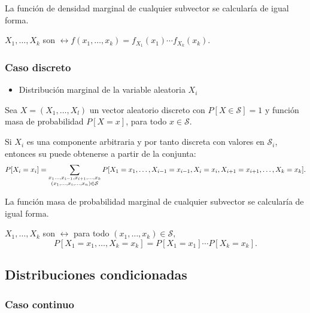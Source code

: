 La función de densidad marginal de cualquier subvector se calcularía de igual forma.

$X_1,\dots,X_k$ son  $\longleftrightarrow f(x_1,\dots,x_k)=f_{X_1}(x_1)\cdots f_{X_k}(x_k)$.

\subsubsection{Caso discreto}
\begin{itemize}[label=\color{red}\textbullet, leftmargin=*]
	\item \color{lightblue}Distribución marginal de la variable aleatoria $X_i$
\end{itemize}
Sea $X=(X_1,\dots,X_l)$ un vector aleatorio discreto con $P[X\in\mathcal{S}]=1$ y función masa de probabilidad $P[X=x]$, para todo $x\in\mathcal{S}$.

Si $X_i$ es una componente arbitraria y por tanto discreta con valores en $\mathcal{S}_i$, entonces su  puede obtenerse a partir de la conjunta: \[ P[X_i=x_i]=\sum_{\begin{subarray}{c}
x_1\dots,x_{i-1},x_{i+1},\dots,x_k\\
(x_1,\dots,x_i,\dots,x_n)\in\mathcal{S}
\end{subarray}}P[X_1=x_1,\dots,X_{i-1}=x_{i-1},X_i=x_i,X_{i+1}=x_{i+1},\dots,X_k=x_k]. \]

La función masa de probabilidad marginal de cualquier subvector se calcularía de igual forma.

$X_1,\dots,X_k$ son  $\longleftrightarrow$ para todo $(x_1,\dots,x_k)\in\mathcal{S},$ \[ P[X_1=x_1,\dots,X_k=x_k]=P[X_1=x_1]\cdots P[X_k=x_k]. \]

\subsection{Distribuciones condicionadas}
\subsubsection{Caso continuo}


